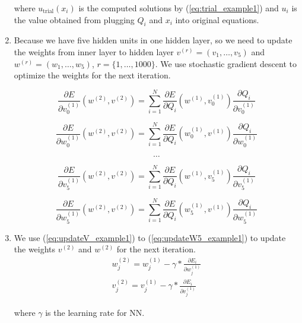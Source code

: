\documentclass{article}
\begin{document}
\begin{enumerate}
	where $u_{\text{trial}}(x_i)$ is the computed solutions by  (\ref{eq:trial_example1}) and $u_i$ is the value obtained from plugging $Q_i$ and $x_i$ into original equations.
	
	
	\item Because we have five hidden units in one hidden layer, so we need to update the weights from inner layer to hidden layer $v^{(r)} = (v_1, \dots, v_5)$ and $w^{(r)} = (w_1, \dots, w_5)$, $r=\{1, \dots, 1000\}$. We use stochastic gradient descent to optimize the weights for the next iteration. 
	
	
	\begin{equation}
	\frac{\partial E}{\partial v_0^{(1)}}(w^{(2)},v^{(2)}) =   \sum_{i=1}^{N} \frac{\partial E}{\partial Q_{i}}(w^{(1)},v_{0}^{(1)})  \frac{\partial Q_{i}}{\partial v_{0}^{(1)}}
	\label{eq:updateV_example1}
	\end{equation}
	
	\begin{equation}
	\frac{\partial E}{\partial w_{0}^{(1)}}(w^{(2)},v^{(2)}) =  \sum_{i=1}^{N} \frac{\partial E}{\partial Q_{i}}(w_{0}^{(1)},v^{(1)}) \frac{\partial Q_{i}}{\partial w_{0}^{(1)}}
	\label{eq:updateW_example1}
	\end{equation}
	
\[\dots\]

	\begin{equation}
	\frac{\partial E}{\partial v_5^{(1)}}(w^{(2)},v^{(2)}) =   \sum_{i=1}^{N} \frac{\partial E}{\partial Q_{i}}(w^{(1)},v_{5}^{(1)})  \frac{\partial Q_{i}}{\partial v_{5}^{(1)}}
	\label{eq:updateV5_example1}
	\end{equation}
	
	\begin{equation}
	\frac{\partial E}{\partial w_{5}^{(1)}}(w^{(2)},v^{(2)}) =  \sum_{i=1}^{N} \frac{\partial E}{\partial Q_{i}}(w_{5}^{(1)},v^{(1)}) \frac{\partial Q_{i}}{\partial w_{5}^{(1)}}
	\label{eq:updateW5_example1}
	\end{equation}
	
	\item We use (\ref{eq:updateV_example1}) to (\ref{eq:updateW5_example1}) to update the weights $v^{(2)}$ and $w^{(2)}$ for the next iteration.
	\begin{equation}
	\begin{aligned}
	w_{j}^{(2)} = w_{j}^{(1)} - \gamma*\frac{\partial E_i}{\partial w_{j}^{(1)}} \\
	v_{j}^{(2)} = v_{j}^{(1)} - \gamma*\frac{\partial E_i}{\partial v_{j}^{(1)}}
	\end{aligned}
	\label{eq:updateVW_example1}
	\end{equation}
	
	where $\gamma$ is the learning rate for NN.
		
	\end{enumerate}
\end{document}
